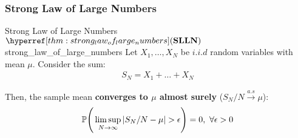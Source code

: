 \subsubsection{Strong Law of Large Numbers}
\begin{theorem}{Strong Law of Large Numbers $\SLLN$}{strong_law_of_large_numbers}
    Let $X_1, \dots, X_N$ be $i.i.d$ random variables with mean $\mu$. Consider the sum:
    \begin{align*}
        S_N = X_1 + \dots + X_N
    \end{align*}

    \noindent Then, the sample mean \textbf{converges to $\mu$ almost surely} ($S_N/N\xrightarrow{a.s}\mu$):
    \begin{align}
        \mathbb{P}\Bigg( 
            \limsup_{N\to\infty}|S_N/N - \mu| > \epsilon
         \Bigg) = 0, \ \forall \epsilon > 0
    \end{align}
\end{theorem}

\begin{proof*}
    
\end{proof*}
